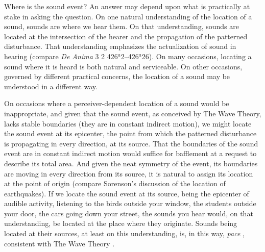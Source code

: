 Where is the sound event? An answer may depend upon what is practically at stake in asking the question. On one natural understanding of the location of a sound, sounds are where we hear them. On that understanding, sounds are located at the intersection of the hearer and the propagation of the patterned disturbance. That understanding emphasizes the actualization of sound in hearing (compare \emph{De Anima} 3 2 426\( ^{a} \)2--426\( ^{a} \)26). On many occasions, locating a sound where it is heard is both natural and serviceable.  On other occasions, governed by different practical concerns, the location of a sound may be understood in a different way. 

On occasions where a perceiver-dependent location of a sound would be inappropriate, and given that the sound event, as conceived by The Wave Theory, lacks stable boundaries (they are in constant indirect motion), we might locate the sound event at its epicenter, the point from which the patterned disturbance is propagating in every direction, at its source. That the boundaries of the sound event are in constant indirect motion would suffice for bafflement at a request to describe its total area. And given the neat symmetry of the event, its boundaries are moving in every direction from its source, it is natural to assign its location at the point of origin (compare Sorenson's \citeyear[138--9]{Sorensen:2009aa} discussion of the location of earthquakes). If we locate the sound event at its source, being the epicenter of audible activity, listening to the birds outside your window, the students outside your door, the cars going down your street, the sounds you hear would, on that understanding, be located at the place where they originate. Sounds being located at their sources, at least on this understanding, is, in this way, \emph{pace} \citet{Pasnau:1999ss}, consistent with The Wave Theory \citep[see][123, for a partial anticipation of this point]{OShaughnessy:2009aa}.


